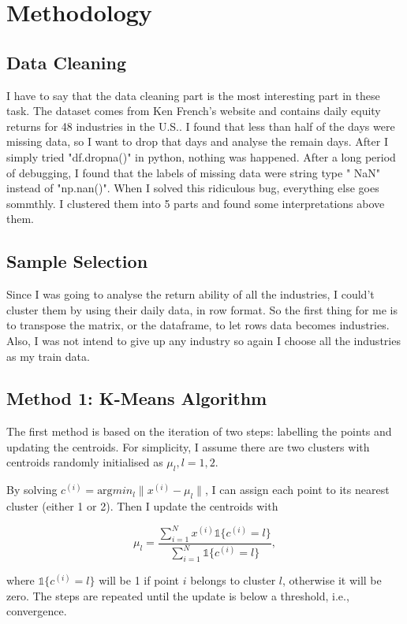 \documentclass[11pt]{report}
\begin{document}
\section{Methodology}

\subsection{Data Cleaning}
I have to say that the data cleaning part is the most interesting part in these task. The dataset comes from Ken French's website and contains daily equity returns for 48 industries in the U.S.. I found that less than half of the days were missing data, so I want to drop that days and analyse the remain days. After I simply tried "df.dropna()" in python, nothing was happened. After a long period of debugging, I found that the labels of missing data were string type " NaN" instead of "np.nan()". When I solved this ridiculous bug, everything else goes sommthly. I clustered them into 5 parts and found some interpretations above them.

\subsection{Sample Selection}
Since I was going to analyse the return ability of all the industries, I could't cluster them by using their daily data, in row format. So the first thing for me is to transpose the matrix, or the dataframe, to let rows data becomes industries. Also, I was not intend to give up any industry so again I choose all the industries as my train data.

\subsection{Method 1: K-Means Algorithm}

The first method is based on the iteration of two steps: labelling the points and updating the centroids. For simplicity, I assume there are two clusters with centroids randomly initialised as $\mu_l, l=1, 2$. 

By solving $c^{(i)} = \text{arg}min_l \lVert x^{(i)} - \mu_l\rVert$, I can assign each point to its nearest cluster (either 1 or 2). Then I update the centroids with 

\[
     \mu_l=\frac{\sum_{i=1}^N x^{(i)}\mathds{1}\{c^{(i)}=l\}}{\sum_{i=1}^N\mathds{1}\{c^{(i)}=l\}}, 
\]

where $\mathds{1}\{c^{(i)}=l\}$ will be 1 if point $i$ belongs to cluster $l$, otherwise it will be zero. The steps are repeated until the update is below a threshold, i.e., convergence.
\end{document}
